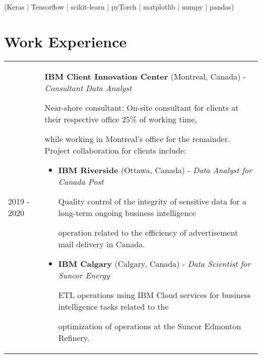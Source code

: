 \documentclass[letterpaper, 10pt]{article}
\begin{document}
\begin{itemize}
\begin{itemize}
            \hspace{1em} (Keras | Tensorflow | scikit-learn | pyTorch | matplotlib | numpy | pandas)
        \end{itemize}
\end{itemize}

\section*{Work Experience}
    \begin{tabular}{p{2.2cm} p{17cm}}
        2019 - 2020 & {\large \textbf{IBM Client Innovation Center} (Montreal, Canada) - \textit{Consultant Data Analyst}}
        \vspace{0.2em}
         
         \hspace{1em} Near-shore consultant: On-site consultant for clients at their respective office 25\% of working time,
         
          \hspace{1em}  while working in Montreal's office for the remainder. Project collaboration for clients include:
            \begin{itemize}
                \item[] \textbf{IBM Riverside} (Ottawa, Canada) - \textit{Data Analyst for Canada Post}

                \hspace{1em} Quality control of the integrity of sensitive data for a long-term ongoing business intelligence
                
                \hspace{1em} operation related to the efficiency of advertisement mail delivery in Canada.

                \vspace{1em}
                
                \item[] \textbf{IBM Calgary} (Calgary, Canada) - \textit{Data Scientist for Suncor Energy}

                \hspace{1em} ETL operations using IBM Cloud services for business intelligence tasks related to the 
                
                \hspace{1em} optimization of operations at the Suncor Edmonton Refinery. 
            \end{itemize} \\
    

\end{tabular}
\end{document}
